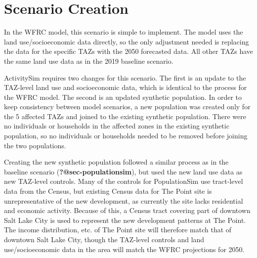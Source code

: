 \documentclass[fancy, twoside, mastersfancy, ms]{byuthesis}
\begin{document}
\begin{table}

\caption{\label{tbl-the-point-data-new}TAZ-level Socioeconomic Data for
The Point (Land Use Scenario)}


\end{table}%

\section{Scenario Creation}\label{scenario-creation}

In the WFRC model, this scenario is simple to implement. The model uses
the land use/socioeconomic data directly, so the only adjustment needed
is replacing the data for the specific TAZs with the 2050 forecasted
data. All other TAZs have the same land use data as in the 2019 baseline
scenario.

ActivitySim requires two changes for this scenario. The first is an
update to the TAZ-level land use and socioeconomic data, which is
identical to the process for the WFRC model. The second is an updated
synthetic population. In order to keep consistency between model
scenarios, a new population was created only for the 5 affected TAZs and
joined to the existing synthetic population. There were no individuals
or households in the affected zones in the existing synthetic
population, so no individuals or households needed to be removed before
joining the two populations.

Creating the new synthetic population followed a similar process as in
the baseline scenario (\textbf{?@sec-populationsim}), but used the new
land use data as new TAZ-level controls. Many of the controls for
PopulationSim use tract-level data from the Census, but existing Census
data for The Point site is unrepresentative of the new development, as
currently the site lacks residential and economic activity. Because of
this, a Census tract covering part of downtown Salt Lake City is used to
represent the new development patterns at The Point. The income
distribution, etc. of The Point site will therefore match that of
downtown Salt Lake City, though the TAZ-level controls and land
use/socioeconomic data in the area will match the WFRC projections for
2050.
\end{document}
